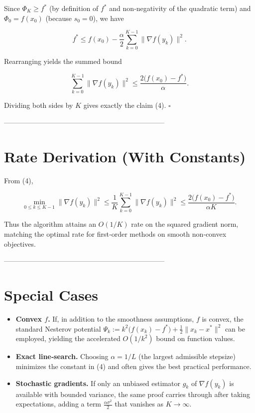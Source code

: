 \documentclass[11pt]{article}
\newcommand{\grad}{\nabla}
\begin{document}
Since \(\Phi_{K}\ge f^{*}\) (by definition of \(f^{*}\) and non‑negativity of the quadratic term) and \(\Phi_{0}=f(x_0)\) (because \(s_0=0\)), we have

\[
f^{*}\le f(x_0)-\frac{\alpha}{2}\sum_{k=0}^{K-1}\|\grad f(y_k)\|^{2}.
\tag{16}
\]

Rearranging yields the summed bound

\[
\sum_{k=0}^{K-1}\|\grad f(y_k)\|^{2}
\le \frac{2\bigl(f(x_0)-f^{*}\bigr)}{\alpha}.
\tag{17}
\]

Dividing both sides by \(K\) gives exactly the claim (4). \(\square\)

---------------------------------------------------------------------

\section*{Rate Derivation (With Constants)}
From (4),

\[
\min_{0\le k\le K-1}\|\grad f(y_k)\|^{2}
\le \frac{1}{K}\sum_{k=0}^{K-1}\|\grad f(y_k)\|^{2}
\le \frac{2\bigl(f(x_0)-f^{*}\bigr)}{\alpha K}.
\]

Thus the algorithm attains an \(\boxed{O(1/K)}\) rate on the squared gradient norm, matching the optimal rate for first‑order methods on smooth non‑convex objectives.

---------------------------------------------------------------------

\section*{Special Cases}
\begin{itemize}
\item \textbf{Convex \(f\).} If, in addition to the smoothness assumptions, \(f\) is convex, the standard Nesterov potential  
\(\Psi_k:=k^{2}\bigl(f(x_k)-f^{*}\bigr)+\tfrac{1}{2}\|x_k-x^{*}\|^{2}\)  
can be employed, yielding the accelerated \(O(1/k^{2})\) bound on function values.
\item \textbf{Exact line‑search.} Choosing \(\alpha = 1/L\) (the largest admissible stepsize) minimizes the constant in (4) and often gives the best practical performance.
\item \textbf{Stochastic gradients.} If only an unbiased estimator \(g_k\) of \(\grad f(y_k)\) is available with bounded variance, the same proof carries through after taking expectations, adding a term \(\frac{\alpha\sigma^{2}}{2}\) that vanishes as \(K\to\infty\).
\end{itemize}
\end{document}

